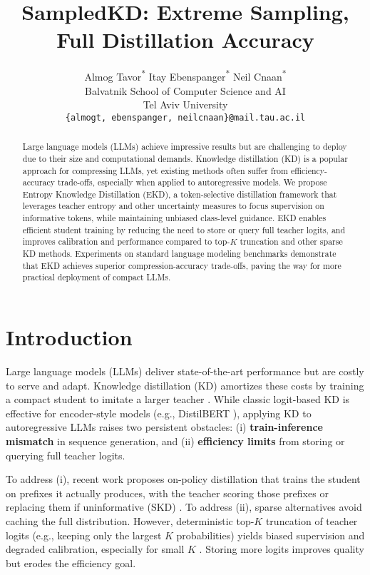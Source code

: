 \documentclass[11pt]{article}
\title{SampledKD: Extreme Sampling, Full Distillation Accuracy}
\author{
  Almog Tavor\textsuperscript{*} \qquad Itay Ebenspanger\textsuperscript{*} \qquad Neil Cnaan\textsuperscript{*} \\
  Balvatnik School of Computer Science and AI \\
  Tel Aviv University \\
  \texttt{\{almogt, ebenspanger, neilcnaan\}@mail.tau.ac.il} \\
}
\begin{document}
\maketitle
\let\thefootnote\relax
\footnotemark
{}
\begin{abstract}
	Large language models (LLMs) achieve impressive results but are challenging to deploy due to their size and computational demands. Knowledge distillation (KD) is a popular approach for compressing LLMs, yet existing methods often suffer from efficiency-accuracy trade-offs, especially when applied to autoregressive models. We propose Entropy Knowledge Distillation (EKD), a token-selective distillation framework that leverages teacher entropy and other uncertainty measures to focus supervision on informative tokens, while maintaining unbiased class-level guidance. EKD enables efficient student training by reducing the need to store or query full teacher logits, and improves calibration and performance compared to top-$K$ truncation and other sparse KD methods. Experiments on standard language modeling benchmarks demonstrate that EKD achieves superior compression-accuracy trade-offs, paving the way for more practical deployment of compact LLMs.
\end{abstract}

\section{Introduction}

Large language models (LLMs) deliver state-of-the-art performance but are costly to serve and adapt. Knowledge distillation (KD) amortizes these costs by training a compact student to imitate a larger teacher \citep{hinton2015distillation}. While classic logit-based KD is effective for encoder-style models (e.g., DistilBERT \citep{sanh2019distilbert}), applying KD to autoregressive LLMs raises two persistent obstacles: (i) \textbf{train-inference mismatch} in sequence generation, and (ii) \textbf{efficiency limits} from storing or querying full teacher logits.

To address (i), recent work proposes on-policy distillation that trains the student on prefixes it actually produces, with the teacher scoring those prefixes \citep{agarwal2024gkd} or replacing them if uninformative (SKD) \citep{xu2024speculative}.
To address (ii), sparse alternatives avoid caching the full distribution. However, deterministic top-$K$ truncation of teacher logits (e.g., keeping only the largest $K$ probabilities) yields biased supervision and degraded calibration, especially for small $K$ \citep{anshumann2025sparse,shum2024first}.
Storing more logits improves quality but erodes the efficiency goal.
\end{document}

